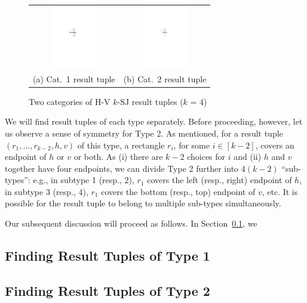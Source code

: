 \documentclass[sigconf]{acmart}
\def\vgap{\vspace{1mm}}
\def\figcapup{\vspace{-0mm}}
\def\figcapdown{\vspace{-0mm}}
\begin{document}
\begin{figure} 
    \begin{tabular}{cc} 
        \includegraphics[height=27mm]{./artwork/type1} & 
        \hspace{5mm} \includegraphics[height=27mm]{./artwork/type2} \\
        (a) Cat.\ 1 result tuple & 
        (b) Cat.\ 2 result tuple
    \end{tabular}
    
    \figcapup 
    \caption{Two categories of H-V $k$-SJ result tuples ($k$ = 4)} 
    \label{fig:hv:types}
    \figcapdown
\end{figure}

\vgap 

We will find result tuples of each type separately. Before proceeding, however, let us observe a sense of symmetry for Type 2. As mentioned, for a result tuple $(r_1, ..., r_{k-2}, h, v)$ of this type, a rectangle $r_i$, for some $i \in [k-2]$, covers an endpoint of $h$ or $v$ or both. As (i) there are $k-2$ choices for $i$ and (ii) $h$ and $v$ together have four endpoints, we can divide Type 2 further into $4(k-2)$ ``sub-types'': e.g., in subtype 1 (resp., 2), $r_1$ covers the left (resp., right) endpoint of $h$, in subtype 3 (resp., 4), $r_1$ covers the bottom (resp., top) endpoint of $v$, etc. It is possible for the result tuple to belong to multiple sub-types simultaneously.

\vgap 

Our subsequent discussion will proceed as follows. In Section~\ref{sec:hv:type1}, we 

\subsection{Finding Result Tuples of Type 1} \label{sec:hv:type1}

\subsection{Finding Result Tuples of Type 2} \label{sec:hv:type2}
\end{document}

